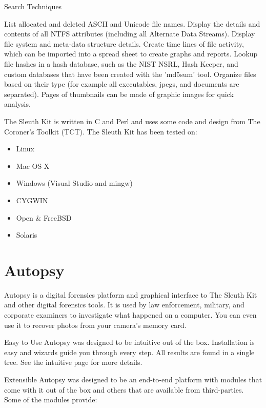 Search Techniques

List allocated and deleted ASCII and Unicode file names.
Display the details and contents of all NTFS attributes (including all Alternate
Data Streams).
Display file system and meta-data structure details.
Create time lines of file activity, which can be imported into a spread sheet to 
create graphs and reports.
Lookup file hashes in a hash database, such as the NIST NSRL, Hash Keeper, and 
custom databases that have been created with the 'md5sum' tool.
Organize files based on their type (for example all executables, jpegs, and
documents are separated). Pages of thumbnails can be made of graphic images 
for quick analysis.

The Sleuth Kit is written in C and Perl and uses some code and design from 
The Coroner's Toolkit (TCT). The Sleuth Kit has been tested on:

\begin{itemize}
\item Linux
\item Mac OS X
\item Windows (Visual Studio and mingw)
\item CYGWIN
\item Open \& FreeBSD
\item Solaris
\end{itemize}

\section{Autopsy}

Autopsy is a digital forensics platform and graphical interface to The Sleuth Kit
and other digital forensics tools. It is used by law enforcement, military, 
and corporate examiners to investigate what happened on a computer. You can even 
use it to recover photos from your camera's memory card.

Easy to Use
Autopsy was designed to be intuitive out of the box. Installation is easy and
wizards guide you through every step. All results are found in a single tree.
See the intuitive page for more details.

Extensible
Autopsy was designed to be an end-to-end platform with modules that come with
it out of the box and others that are available from third-parties. Some of the
modules provide:

